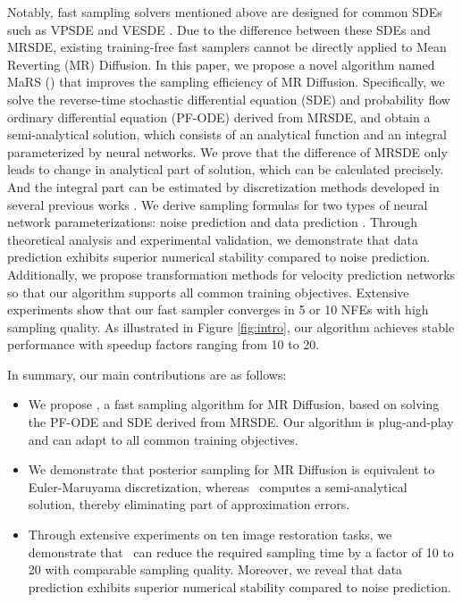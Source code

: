 Notably, fast sampling solvers mentioned above are designed for common SDEs such as VPSDE and VESDE \citep{song2020sde}. Due to the difference between these SDEs and MRSDE, existing training-free fast samplers cannot be directly applied to Mean Reverting (MR) Diffusion. In this paper, we propose a novel algorithm named MaRS (\ourmethod) that improves the sampling efficiency of MR Diffusion. Specifically, we solve the reverse-time stochastic differential equation (SDE) and probability flow ordinary differential equation (PF-ODE) \citep{song2020sde} derived from MRSDE, and obtain a semi-analytical solution, which consists of an analytical function and an integral parameterized by neural networks. We prove that the difference of MRSDE only leads to change in analytical part of solution, which can be calculated precisely. And the integral part can be estimated by discretization methods developed in several previous works \citep{lu2022dpmsolver,zhang2022deis,zhao2024unipc}. We derive sampling formulas for two types of neural network parameterizations: noise prediction \citep{ho2020ddpm,song2020sde} and data prediction \citep{salimans2022progressive}. Through theoretical analysis and experimental validation, we demonstrate that data prediction exhibits superior numerical stability compared to noise prediction. Additionally, we propose transformation methods for velocity prediction networks \citep{salimans2022progressive} so that our algorithm supports all common training objectives. Extensive experiments show that our fast sampler converges in 5 or 10 NFEs with high sampling quality. As illustrated in Figure \ref{fig:intro}, our algorithm achieves stable performance with speedup factors ranging from 10 to 20.



In summary, our main contributions are as follows:
\begin{itemize}
    \item We propose \textit{\ourmethod}, a fast sampling algorithm for MR Diffusion, based on solving the PF-ODE and SDE derived from MRSDE. Our algorithm is plug-and-play and can adapt to all common training objectives.
    \item We demonstrate that posterior sampling \citep{luo2024posterior} for MR Diffusion is equivalent to Euler-Maruyama discretization, whereas \ourmethod~computes a semi-analytical solution, thereby eliminating part of approximation errors.
    \item Through extensive experiments on ten image restoration tasks, we demonstrate that \ourmethod~can reduce the required sampling time by a factor of 10 to 20 with comparable sampling quality. Moreover, we reveal that data prediction exhibits superior numerical stability compared to noise prediction.
\end{itemize}